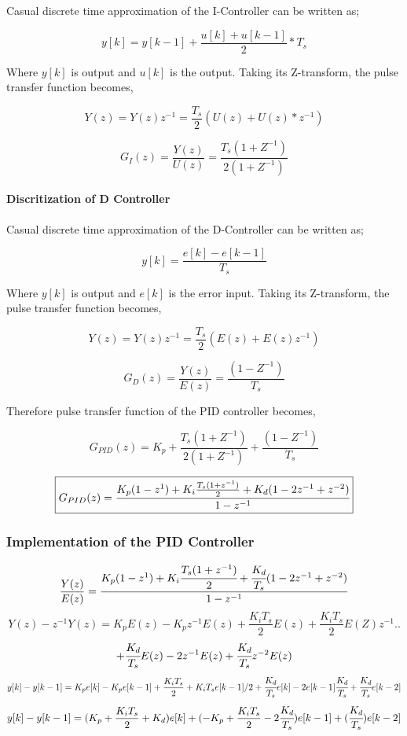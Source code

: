\documentclass[a4paper,12pt]{article}
\begin{document}
\begin{enumerate}
	Casual discrete time approximation of the I-Controller can be written as;
	
	$$  y[k]=y[k-1]+\frac{u[k]+u[k-1]}{2}*T_s $$
	
	Where $y[k]$ is output and $u[k]$ is the output. Taking its Z-transform, the pulse transfer function becomes,
	
	$$ Y(z) = Y(z) z^{-1}=\frac{T_s}{2}\left(U(z)+U(z)*z^{-1} \right) $$
	
	$$ G_I(z)=\frac{Y(z)}{U(z)}=\frac{T_s (1+Z^{-1})}{2 (1+Z^{-1})} $$
	
	\paragraph*{ Discritization of D Controller }
	
	Casual discrete time approximation of the D-Controller can be written as;
	
	$$  y[k]=\frac{e[k]-e[k-1]}{T_s} $$
	
	Where $y[k]$ is output and $e[k]$ is the error input. Taking its Z-transform, the pulse transfer function becomes,
	
	$$ Y(z) = Y(z) z^{-1}=\frac{T_s}{2}\left(E(z)+E(z) z^{-1} \right) $$
	
	$$ G_D(z)=\frac{Y(z)}{E(z)}=\frac{(1-Z^{-1})}{T_s} $$
	
	
	Therefore pulse transfer function of the PID controller becomes,
	
	$$ G_{PID}(z)=K_p+	\frac{T_s (1+Z^{-1})}{2 (1+Z^{-1})} + \frac{(1-Z^{-1})}{T_s} $$
	
	$$ \boxed{	 G_{PID}(z)=\cfrac{K_p(1-z^{1})+K_i \frac{T_s (1+z^{-1})}{2}+K_d (1-2z^{-1}+z^{-2})}{1-z^{-1}}	}$$	
	
	\subsubsection*{Implementation of the PID Controller}
	
	$$ \frac{Y(z)}{E(z)}=\frac{K_p(1-z^{1})+K_i \cfrac{T_s (1+z^{-1})}{2}+\cfrac{K_d}{T_s} (1-2z^{-1}+z^{-2})}{1-z^{-1}}$$
	$$ Y(z)-z^{-1} Y(z)=K_p E(z)-K_p z^{-1} E(z)+\frac{K_i T_s}{2} E(z) +\frac{K_i T_s}{2} E(Z) z^{-1} .. $$
	$$ +\cfrac{K_d}{T_s} E(z)-2 z^{-1} E(z)+\cfrac{K_d}{T_s} z^{-2} E(z)	$$
	$$ y[k]-y[k-1]=K_p e[k]-K_p e[k-1]+\frac{K_i T_s}{2}+K_i T_s e[k-1]/2+\cfrac{K_d}{T_s} e[k]-2 e[k-1] \cfrac{K_d}{T_s}+ \cfrac{K_d}{T_s} e[k-2]	$$
	$$ y[k]-y[k-1] = (K_p+\frac{K_i T_s}{2}+K_d) e[k]+(-K_p+\frac{K_i T_s}{2}-2 \cfrac{K_d}{T_s} ) e[k-1]+(\cfrac{K_d}{T_s}) e[k-2] $$
	

\end{enumerate}
\end{document}
